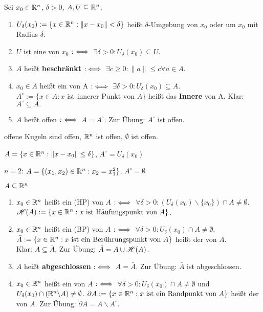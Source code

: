 \documentclass[a4paper,oneside,DIV15,BCOR12mm,chapterprefix=true,headings=onelinechapter]{scrbook}
\begin{document}
\begin{definition}
Sei $x_0 \in \mathbb{R}^n$, $\delta > 0$, $A, U\subseteq \mathbb{R}^n$.
\begin{enumerate}
 \item $U_\delta(x_0) := \{ x \in \mathbb{R}^n: \|x-x_0\|<\delta\}$ heißt $\delta$-Umgebung von $x_0$ oder  um $x_0$ mit Radius $\delta$.
 \item $U$ ist eine  von $x_0$ $:\iff$ $\exists \delta > 0 : U_\delta(x_0) \subseteq U$.
 \item {}$A$ heißt \textbf{beschränkt} $:\iff$ $\exists c \ge 0: \|a\|\le c \forall a\in A$.
 \item $x_0\in A$ heißt ein  von A $:\iff$ $\exists \delta>0: U_\delta(x_0) \subseteq A$. \\
   $A^\circ:=\{ x\in A: x \text{ ist innerer Punkt von }A\}$ heißt das \textbf{Innere} von A. Klar: $A^\circ\subseteq A.$
 \item $A$ heißt offen $:\iff$ $A=A^\circ$. Zur Übung: $A^\circ$ ist offen.
\end{enumerate}
\end{definition}

\begin{beispiele}
 \item offene Kugeln sind offen, $\mathbb{R}^n$ ist offen, $\emptyset$ ist offen.
 \item $A=\{x\in\mathbb{R}^n: \|x-x_0\|\le \delta\}$, $A^\circ = U_\delta(x_0)$
 \item $n=2$: $A=\{(x_1,x_2)\in\mathbb{R}^n: x_2 = x_1^2\}$, $A^\circ=\emptyset$
\end{beispiele}

\begin{definition}
 $A\subseteq \mathbb{R}^n$
 \begin{enumerate}
 \item $x_0\in \mathbb{R}^n$ heißt ein  (HP) von $A$ $:\iff$ $\forall \delta > 0: (U_\delta(x_0) \backslash \{x_0\}) \cap A \ne \emptyset$. $\mathscr{H}(A) := \{ x\in\mathbb{R}^n: x \text{ ist Häufungspunkt von } A\}$.
 \item  $x_0\in\mathbb{R}^n$ heißt ein  (BP) von $A$ $:\iff$ $\forall\delta>0: U_\delta(x_0) \cap A \ne \emptyset$. $\bar{A}:=\{x\in\mathbb{R}^n: x \text{ ist ein Berührungspunkt von } A\}$ heißt der  von $A$.\\
 Klar: $A\subseteq\bar{A}$. Zur Übung: $\bar{A} = A \cup \mathscr{H}(A)$.
 \item {}$A$ heißt \textbf{abgeschlossen} $:\iff$ $A=\bar{A}$. Zur Übung: $\bar{A}$ ist abgeschlossen.
 \item $x_0\in\mathbb{R}^n$ heißt ein  von $A$ $:\iff$ $\forall\delta>0: U_\delta(x_0) \cap A \ne \emptyset$ und $U_\delta(x_0) \cap (\mathbb{R}^n\backslash A) \ne \emptyset$. $\partial A := \{x\in\mathbb{R}^n: x \text{ ist ein Randpunkt von } A \}$ heißt der  von $A$. Zur Übung: $\partial A = \bar{A}\backslash A^\circ$.
 \end{enumerate}
\end{definition}
\end{document}
